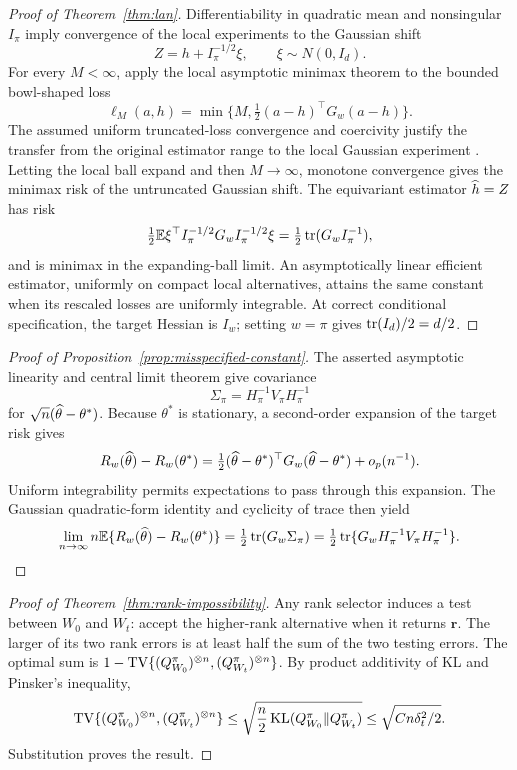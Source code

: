 \begin{proof}[Proof of Theorem~\ref{thm:lan}]
Differentiability in quadratic mean and nonsingular \(I_\pi\) imply convergence of the local experiments to the Gaussian shift
\[
Z=h+I_\pi^{-1/2}\xi,\qquad \xi\sim N(0,I_d).
\]
For every \(M<\infty\), apply the local asymptotic minimax theorem to the
bounded bowl-shaped loss
\[
\ell_M(a,h)=\min\{M,\tfrac12(a-h)^\top G_w(a-h)\}.
\]
The assumed uniform truncated-loss convergence and coercivity justify the
transfer from the original estimator range to the local Gaussian experiment
\citep{vandervaart1998}. Letting the local ball expand and then
\(M\to\infty\), monotone convergence gives the minimax risk of the untruncated
Gaussian shift. The equivariant estimator \(\widehat h=Z\) has risk
\[
\tfrac12\mathbb E\xi^\top I_\pi^{-1/2}G_wI_\pi^{-1/2}\xi
=\tfrac12\operatorname{tr}(G_wI_\pi^{-1}),
\]
and is minimax in the expanding-ball limit. An asymptotically linear efficient
estimator, uniformly on compact local alternatives, attains the same constant
when its rescaled losses are uniformly integrable. At correct conditional
specification, the target Hessian is \(I_w\); setting \(w=\pi\) gives
\(\operatorname{tr}(I_d)/2=d/2\).
\end{proof}

\begin{proof}[Proof of Proposition~\ref{prop:misspecified-constant}]
The asserted asymptotic linearity and central limit theorem give covariance
\[
\Sigma_\pi=H_\pi^{-1}V_\pi H_\pi^{-1}
\]
for \(\sqrt n(\widehat\theta-\theta^*)\). Because \(\theta^*\) is stationary, a
second-order expansion of the target risk gives
\[
R_w(\widehat\theta)-R_w(\theta^*)
=\tfrac12(\widehat\theta-\theta^*)^\top
G_w(\widehat\theta-\theta^*)+o_p(n^{-1}).
\]
Uniform integrability permits expectations to pass through this expansion.
The Gaussian quadratic-form identity and cyclicity of trace then yield
\[
\lim_{n\to\infty}n\mathbb E\{R_w(\widehat\theta)-R_w(\theta^*)\}
=\tfrac12\operatorname{tr}(G_w\Sigma_\pi)
=\tfrac12\operatorname{tr}\{G_wH_\pi^{-1}V_\pi H_\pi^{-1}\}.
\]
\end{proof}

\begin{proof}[Proof of Theorem~\ref{thm:rank-impossibility}]
Any rank selector induces a test between \(W_0\) and \(W_t\): accept the higher-rank alternative when it returns \(\bm r\). The larger of its two rank errors is at least half the sum of the two testing errors. The optimal sum is
\(1-\operatorname{TV}\{(Q_{W_0}^\pi)^{\otimes n},(Q_{W_t}^\pi)^{\otimes n}\}\). By product additivity of KL and Pinsker's inequality,
\[
\operatorname{TV}\{(Q_{W_0}^\pi)^{\otimes n},(Q_{W_t}^\pi)^{\otimes n}\}
\le\sqrt{\frac n2\operatorname{KL}(Q_{W_0}^\pi\|Q_{W_t}^\pi)}
\le\sqrt{Cn\delta_t^2/2}.
\]
Substitution proves the result.
\end{proof}

